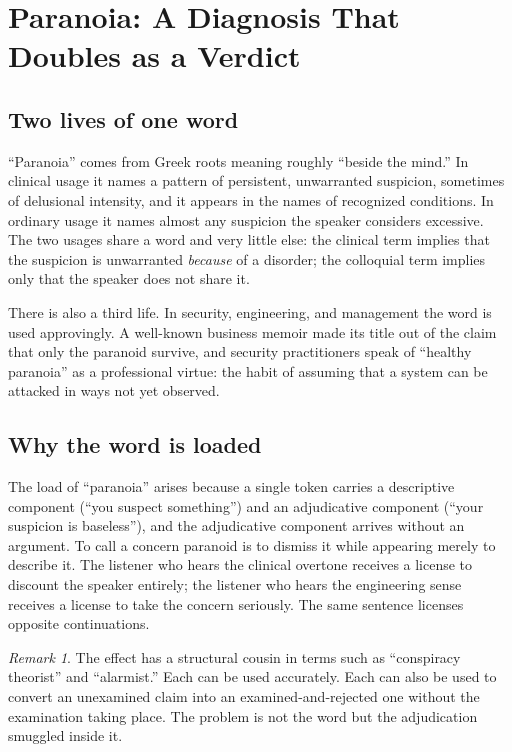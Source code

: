 \documentclass[11pt,a4paper]{article}
\theoremstyle{plain}
\theoremstyle{definition}
\theoremstyle{remark}
\newtheorem{remark}{Remark}
\begin{document}
\section{Paranoia: A Diagnosis That Doubles as a Verdict}

\subsection{Two lives of one word}

``Paranoia'' comes from Greek roots meaning roughly ``beside the mind.'' In clinical usage it names a pattern of persistent, unwarranted suspicion, sometimes of delusional intensity, and it appears in the names of recognized conditions. In ordinary usage it names almost any suspicion the speaker considers excessive. The two usages share a word and very little else: the clinical term implies that the suspicion is unwarranted \emph{because} of a disorder; the colloquial term implies only that the speaker does not share it.

There is also a third life. In security, engineering, and management the word is used approvingly. A well-known business memoir made its title out of the claim that only the paranoid survive, and security practitioners speak of ``healthy paranoia'' as a professional virtue: the habit of assuming that a system can be attacked in ways not yet observed.

\subsection{Why the word is loaded}

The load of ``paranoia'' arises because a single token carries a descriptive component (``you suspect something'') and an adjudicative component (``your suspicion is baseless''), and the adjudicative component arrives without an argument. To call a concern paranoid is to dismiss it while appearing merely to describe it. The listener who hears the clinical overtone receives a license to discount the speaker entirely; the listener who hears the engineering sense receives a license to take the concern seriously. The same sentence licenses opposite continuations.

\begin{remark}
The effect has a structural cousin in terms such as ``conspiracy theorist'' and ``alarmist.'' Each can be used accurately. Each can also be used to convert an unexamined claim into an examined-and-rejected one without the examination taking place. The problem is not the word but the adjudication smuggled inside it.
\end{remark}
\end{document}
